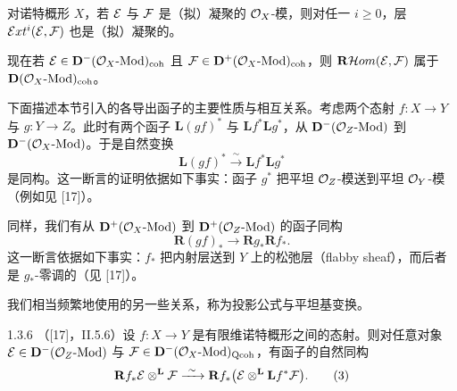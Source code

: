 对诺特概形 $X$，若 $\mathcal{E}$ 与 $\mathcal{F}$ 是（拟）凝聚的 $\mathcal{O}_X$-模，则对任一 $i\geqslant 0$，层 $\mathcal{E}xt^{i}(\mathcal{E},\mathcal{F})$ 也是（拟）凝聚的。

现在若 $\mathcal{E}\in\mathbf{D}^{-}(\mathcal{O}_X\text{-}\mathrm{Mod})_{\mathrm{coh}}$ 且 $\mathcal{F}\in\mathbf{D}^{+}(\mathcal{O}_X\text{-}\mathrm{Mod})_{\mathrm{coh}}$，则 $\mathbf{R}\mathcal{H}om(\mathcal{E},\mathcal{F})$ 属于 $\mathbf{D}(\mathcal{O}_X\text{-}\mathrm{Mod})_{\mathrm{coh}}$。


下面描述本节引入的各导出函子的主要性质与相互关系。考虑两个态射 $f:X\to Y$ 与 $g:Y\to Z$。此时有两个函子 $\mathbf{L}(gf)^{*}$ 与 $\mathbf{L}f^{*}\mathbf{L}g^{*}$，从 $\mathbf{D}^{-}(\mathcal{O}_Z\text{-}\mathrm{Mod})$ 到 $\mathbf{D}^{-}(\mathcal{O}_X\text{-}\mathrm{Mod})$。于是自然变换
\begin{equation*}
\mathbf{L}(gf)^{*}\xrightarrow{\ \sim\ }\mathbf{L}f^{*}\mathbf{L}g^{*}
\end{equation*}
是同构。这一断言的证明依据如下事实：函子 $g^{*}$ 把平坦 $\mathcal{O}_Z$-模送到平坦 $\mathcal{O}_Y$-模（例如见 [17]）。

同样，我们有从 $\mathbf{D}^{+}(\mathcal{O}_X\text{-}\mathrm{Mod})$ 到 $\mathbf{D}^{+}(\mathcal{O}_Z\text{-}\mathrm{Mod})$ 的函子同构
\begin{equation*}
\mathbf{R}(gf)_{*}\longrightarrow\mathbf{R}g_{*}\mathbf{R}f_{*}.
\end{equation*}
这一断言依据如下事实：$f_{*}$ 把内射层送到 $Y$ 上的松弛层（flabby sheaf），而后者是 $g_{*}$-零调的（见 [17]）。

我们相当频繁地使用的另一些关系，称为投影公式与平坦基变换。

\begin{proposition}{1.3.6}
（[17]，II.5.6）设 $f:X\to Y$ 是有限维诺特概形之间的态射。则对任意对象 $\mathcal{E}\in\mathbf{D}^{-}(\mathcal{O}_Z\text{-}\mathrm{Mod})$ 与 $\mathcal{F}\in\mathbf{D}^{-}(\mathcal{O}_X\text{-}\mathrm{Mod})_{\mathrm{Qcoh}}$，有函子的自然同构
\begin{equation}
\mathbf{R}f_{*}\cE\otL\cF\xrightarrow{\ \sim\ }\mathbf{R}f_{*}\bigl(\cE\otL\mathbf{L}f^{*}\cF\bigr).
\tag{3}
\end{equation}
\end{proposition}

